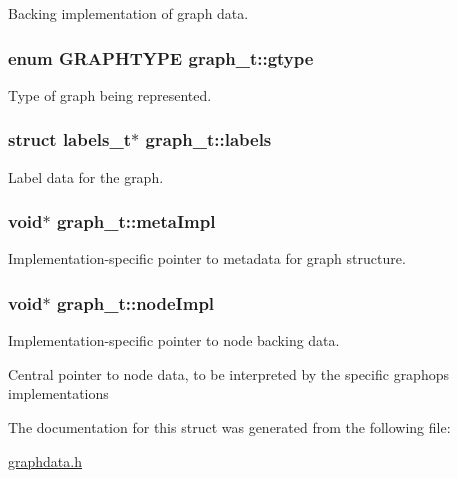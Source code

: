 Backing implementation of graph data. 

\subsubsection[{\texorpdfstring{gtype}{gtype}}]{\setlength{\rightskip}{0pt plus 5cm}enum {\bf G\+R\+A\+P\+H\+T\+Y\+PE} graph\+\_\+t\+::gtype}\hypertarget{structgraph__t_a602be255ab0523e0a5fe28436a29159a}{}\label{structgraph__t_a602be255ab0523e0a5fe28436a29159a}


Type of graph being represented. 

\subsubsection[{\texorpdfstring{labels}{labels}}]{\setlength{\rightskip}{0pt plus 5cm}struct {\bf labels\+\_\+t}$\ast$ graph\+\_\+t\+::labels}\hypertarget{structgraph__t_ab0661b91402642806325cb4f4da9dc24}{}\label{structgraph__t_ab0661b91402642806325cb4f4da9dc24}


Label data for the graph. 

\subsubsection[{\texorpdfstring{meta\+Impl}{metaImpl}}]{\setlength{\rightskip}{0pt plus 5cm}void$\ast$ graph\+\_\+t\+::meta\+Impl}\hypertarget{structgraph__t_ab11b23897ec5b39d38c3f85581bd313e}{}\label{structgraph__t_ab11b23897ec5b39d38c3f85581bd313e}


Implementation-\/specific pointer to metadata for graph structure. 

\subsubsection[{\texorpdfstring{node\+Impl}{nodeImpl}}]{\setlength{\rightskip}{0pt plus 5cm}void$\ast$ graph\+\_\+t\+::node\+Impl}\hypertarget{structgraph__t_a3bf6344f03f4cbc69345d026da2e3368}{}\label{structgraph__t_a3bf6344f03f4cbc69345d026da2e3368}


Implementation-\/specific pointer to node backing data. 

Central pointer to node data, to be interpreted by the specific graphops implementations 

The documentation for this struct was generated from the following file\+:\begin{DoxyCompactItemize}
\item 
\hyperlink{graphdata_8h}{graphdata.\+h}\end{DoxyCompactItemize}

